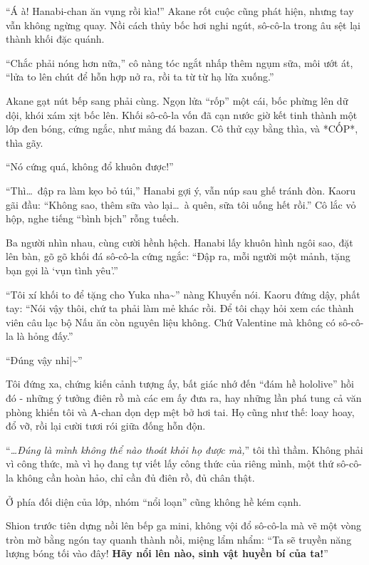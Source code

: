 \documentclass[../main.tex]{subfiles}
\begin{document}
``Á à! Hanabi-chan ăn vụng rồi kìa!'' Akane rốt cuộc cũng phát hiện, nhưng tay vẫn không ngừng quay. Nồi cách thủy bốc hơi nghi ngút, sô-cô-la trong âu sệt lại thành khối đặc quánh.

``Chắc phải nóng hơn nữa,'' cô nàng tóc ngắt nhấp thêm ngụm sữa, môi ướt át, ``lửa to lên chút để hỗn hợp nở ra, rồi ta từ từ hạ lửa xuống.''

Akane gạt nút bếp sang phải cùng. Ngọn lửa ``rốp'' một cái, bốc phừng lên dữ dội, khói xám xịt bốc lên. Khối sô-cô-la vốn đã cạn nước giờ kết tinh thành một lớp đen bóng, cứng ngắc, như mảng đá bazan. Cô thử cạy bằng thìa, và  *CỐP*, thìa gãy.

``Nó cứng quá, không đổ khuôn được!''

``Thì\dots\ đập ra làm kẹo bỏ túi,'' Hanabi gợi ý, vẫn núp sau ghế tránh đòn.
Kaoru gãi đầu: ``Không sao, thêm sữa vào lại\dots\ à quên, sữa tôi uống hết rồi.'' Cô lắc vỏ hộp, nghe tiếng ``bình bịch'' rỗng tuếch.

Ba người nhìn nhau, cùng cười hềnh hệch. Hanabi lấy khuôn hình ngôi sao, đặt lên bàn, gõ gõ khối đá sô-cô-la cứng ngắc: ``Đập ra, mỗi người một mảnh, tặng bạn gọi là `vụn tình yêu'.''

``Tôi xí khối to để tặng cho Yuka nha\~{}'' nàng Khuyển nói. Kaoru đứng dậy, phất tay: ``Nói vậy thôi, chứ ta phải làm mẻ khác rồi. Để tôi chạy hỏi xem các thành viên câu lạc bộ Nấu ăn còn nguyên liệu không. Chứ Valentine mà không có sô-cô-la là hỏng đấy.''

``Đúng vậy nhỉ|\~{}''

Tôi đứng xa, chứng kiến cảnh tượng ấy, bất giác nhớ đến ``đám hề hololive'' hồi đó - những ý tưởng điên rồ mà các em ấy đưa ra, hay những lần phá tung cả văn phòng khiến tôi và A-chan dọn dẹp mệt bở hơi tai. Họ cũng như thế: loay hoay, đổ vỡ, rồi lại cười tươi rói giữa đống hỗn độn.

``\textit{\dots Đúng là mình không thể nào thoát khỏi họ được mà,}'' tôi thì thầm. Không phải vì công thức, mà vì họ đang tự viết lấy công thức của riêng mình, một thứ sô-cô-la không cần hoàn hảo, chỉ cần đủ điên rồ, đủ chân thật.

\ct

Ở phía đối diện của lớp, nhóm ``nổi loạn'' cũng không hề kém cạnh.

Shion trước tiên dựng nồi lên bếp ga mini, không vội đổ sô-cô-la mà vẽ một vòng tròn mờ bằng ngón tay quanh thành nồi, miệng lẩm nhẩm: ``Ta sẽ truyền năng lượng bóng tối vào đây! \textbf{Hãy nổi lên nào, sinh vật huyền bí của ta!}''
\end{document}
